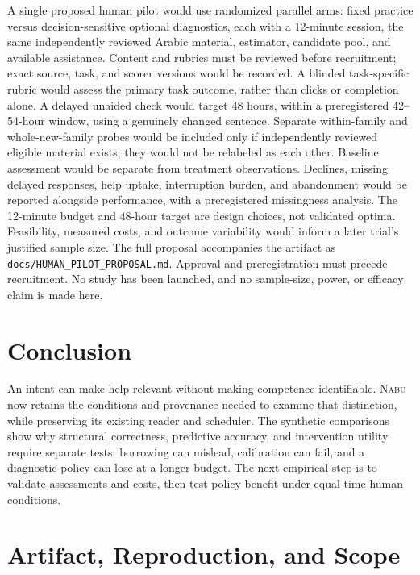 \documentclass{article}
\newcommand{\Nabu}{\textsc{Nabu}}
\newcommand{\artifact}[1]{\nolinkurl{#1}}
\begin{document}
A single proposed human pilot would use randomized parallel arms: fixed practice versus decision-sensitive optional diagnostics, each with a 12-minute session, the same independently reviewed Arabic material, estimator, candidate pool, and available assistance. Content and rubrics must be reviewed before recruitment; exact source, task, and scorer versions would be recorded. A blinded task-specific rubric would assess the primary task outcome, rather than clicks or completion alone. A delayed unaided check would target 48 hours, within a preregistered 42--54-hour window, using a genuinely changed sentence. Separate within-family and whole-new-family probes would be included only if independently reviewed eligible material exists; they would not be relabeled as each other. Baseline assessment would be separate from treatment observations. Declines, missing delayed responses, help uptake, interruption burden, and abandonment would be reported alongside performance, with a preregistered missingness analysis. The 12-minute budget and 48-hour target are design choices, not validated optima. Feasibility, measured costs, and outcome variability would inform a later trial's justified sample size. The full proposal accompanies the artifact as \artifact{docs/HUMAN_PILOT_PROPOSAL.md}. Approval and preregistration must precede recruitment. No study has been launched, and no sample-size, power, or efficacy claim is made here.

\section{Conclusion}

An intent can make help relevant without making competence identifiable. \Nabu{} now retains the conditions and provenance needed to examine that distinction, while preserving its existing reader and scheduler. The synthetic comparisons show why structural correctness, predictive accuracy, and intervention utility require separate tests: borrowing can mislead, calibration can fail, and a diagnostic policy can lose at a longer budget. The next empirical step is to validate assessments and costs, then test policy benefit under equal-time human conditions.

\label{mainbodyend}
\FloatBarrier
\raggedbottom



\clearpage
\appendix
\onecolumn
\section{Artifact, Reproduction, and Scope}
\label{app:artifact}
\end{document}
